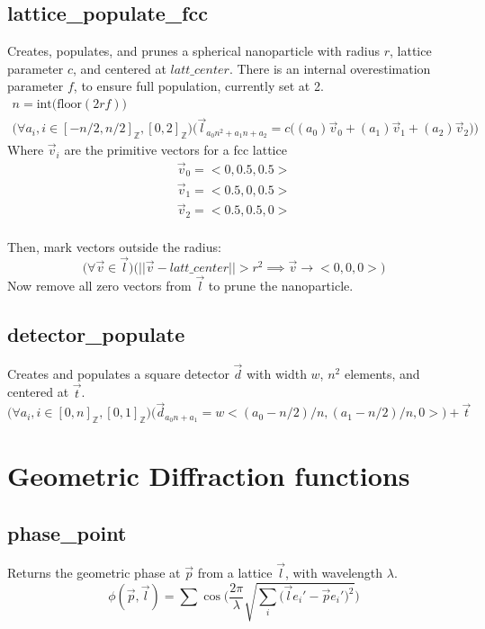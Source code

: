 \documentclass{article}
\begin{document}
		\subsection{lattice\_populate\_fcc}
			Creates, populates, and prunes a spherical nanoparticle with radius $r$,  lattice parameter $c$, and centered at $latt\_center$. There is an internal overestimation parameter $f$, to ensure full population, currently set at 2.
				\begin{gather*}
					n = \text{int}\bigg(\text{floor} (2rf) \bigg)			\\
					\Bigg(  \forall	a_i,i \in [-n/2,n/2]_{\mathbb{Z}},[0,2]_{\mathbb{Z}}\Bigg) \Bigg( \vec{l}_{a_0 n^2 +a_1 n + a_2} = c  \big( (a_0)\vec{v}_0 + (a_1)\vec{v}_1 + (a_2)\vec{v}_2 \big) \Bigg)
				\end{gather*}
			Where $\vec{v}_i$ are the primitive vectors for a fcc lattice
				\begin{gather*}
					\vec{v}_0= \big<0,0.5,0.5\big>		\\
					\vec{v}_1= \big<0.5,0,0.5\big>		\\
					\vec{v}_2= \big<0.5,0.5,0\big>		\\
				\end{gather*}
			
			Then, mark vectors outside the radius:
				\begin{equation}
					\Bigg(  \forall \vec{v} \in \vec{l}  \Bigg)  \Bigg(  || \vec{v}-latt\_center ||>r^2  \implies \vec{v}\to \big<0,0,0\big> \Bigg)  
				\end{equation}
			Now remove all zero vectors from $\vec{l}$ to prune the nanoparticle.
			
		\subsection{detector\_populate}
			Creates and populates a square detector $\vec{d}$ with width $w$, $n^2$ elements, and centered at $\vec{t}$.
				\begin{equation}
					\Bigg(  \forall	a_i,i \in [0,n]_{\mathbb{Z}},[0,1]_{\mathbb{Z}}\Bigg) \Bigg( \vec{d}_{a_0 n +a_1} = w \big< (a_0-n/2)/n, (a_1-n/2)/n, 0 \big>  \Bigg) + \vec{t}
				\end{equation}



	\section{Geometric Diffraction functions}
		\subsection{phase\_point}
			Returns the geometric phase at $\vec{p}$ from a lattice $\vec{l}$, with wavelength $\lambda$.
				\begin{equation}
					\phi(\vec{p},\vec{l}) = \sum \cos \Bigg(\frac{2\pi}{\lambda} \sqrt{ \sum_i \big(\vec{l} e_i' - \vec{p} e_i'\big)^2}\Bigg)
				\end{equation}
\end{document}
